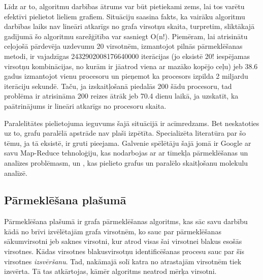 Līdz ar to, algoritmu darbības ātrums var būt pietiekami zems, lai tos varētu
efektīvi pielietot lieliem grafiem. Situāciju saasina fakts, ka vairāku algoritmu
darbības laiks nav lineāri atkarīgs no grafa virsotņu
skaita, turpretim, sliktākajā gadījumā šo algoritmu sarežģītība var sasniegt O(n!).
Piemēram, lai atrisinātu ceļojošā pārdevēja uzdevumu 20 virsotnēm, izmantojot pilnās
pārmeklēšanas metodi, ir vajadzīgas 2432902008176640000 iterācijas (jo eksistē 20!
iespējamas virsotņu kombinācijas, no kurām ir jāatrod viena ar mazāko kopējo ceļu)
jeb 38.6 gadus izmantojot vienu procesoru un pieņemot ka procesors izpilda 2 miljardu
iterāciju sekundē. Taču, ja izskaitļošanā piedalās 200 šādu procesoru, tad problēma
ir atrisināma 200 reizes ātrāk jeb 70.4 dienu laikā, ja uzskatīt, ka paātrinājums
ir lineāri atkarīgs no procesoru skaita.

Paralelitātes pielietojuma ieguvums šajā situācijā ir acīmredzams. Bet neskatoties
uz to, grafu paralēlā apstrāde nav plaši izpētīta. Specializēta literatūra par šo
tēmu, ja tā eksistē, ir gruti pieejama. Galvenie spēlētāju šajā jomā
ir Google ar savu Map-Reduce tehnoloģiju, kas nodarbojas ar ar tīmekļa pārmeklēšanas
un analīzes problēmasm, un , kas pielieto grafus un paralēlo
skaitļošanu molekulu analīzē.

\subsection{Pārmeklēšana plašumā}
Pārmeklēšana plašumā  ir grafa pārmeklēšanas
algoritms, kas sāc savu darbību kādā no brīvi izvēlētajām grafa virsotnēm, ko sauc
par pārmeklēšanas sākumvirsotni jeb saknes virsotni, kur atrod visas šai virsotnei
blakus esošās virsotnes. Kādas virsotnes blakusvirsotņu identificēšanas procesu
sauc par šīs virsotnes \emph{izsvēršanu}. Tad, nakāmajā solī katra no atrastajām
virsotnēm tiek izsvērta. Tā tas atkārtojas, kāmēr algoritms neatrod mērķa virsotni.


